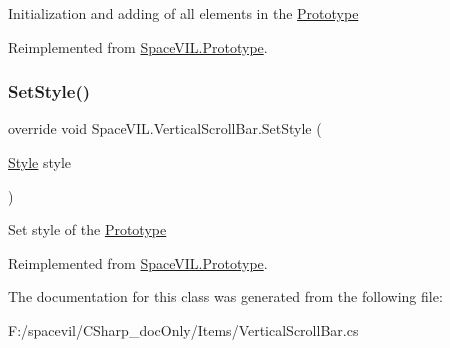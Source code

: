 Initialization and adding of all elements in the \mbox{\hyperlink{class_space_v_i_l_1_1_prototype}{Prototype}} 



Reimplemented from \mbox{\hyperlink{class_space_v_i_l_1_1_prototype_ac3379fe02923ee155b5b0084abf27420}{Space\+V\+I\+L.\+Prototype}}.

\mbox{\label{class_space_v_i_l_1_1_vertical_scroll_bar_a94bfbdb137de9b7301e6e07074eb2069}} 
\subsubsection{\texorpdfstring{Set\+Style()}{SetStyle()}}
{\footnotesize\ttfamily override void Space\+V\+I\+L.\+Vertical\+Scroll\+Bar.\+Set\+Style (\begin{DoxyParamCaption}\item[{\mbox{\hyperlink{class_space_v_i_l_1_1_decorations_1_1_style}{Style}}}]{style }\end{DoxyParamCaption})\hspace{0.3cm}{\ttfamily [virtual]}}



Set style of the \mbox{\hyperlink{class_space_v_i_l_1_1_prototype}{Prototype}} 



Reimplemented from \mbox{\hyperlink{class_space_v_i_l_1_1_prototype_ae96644a6ace490afb376fb542161e541}{Space\+V\+I\+L.\+Prototype}}.



The documentation for this class was generated from the following file\+:\begin{DoxyCompactItemize}
\item 
F\+:/spacevil/\+C\+Sharp\+\_\+doc\+Only/\+Items/Vertical\+Scroll\+Bar.\+cs\end{DoxyCompactItemize}
